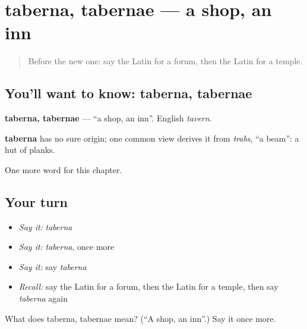 \section[taberna, tabernae]{taberna, tabernae — a shop, an inn}

\label{lesson:LA-C107-taberna}



\begin{quote}
Before the new one: say the Latin for a forum, then the Latin for a temple.
\end{quote}

\subsection*{You'll want to know: taberna, tabernae}
\textbf{taberna, tabernae} — \textquotedblleft{}a shop, an inn\textquotedblright{}. English \emph{tavern}.

\begin{cousinweb}
\textbf{taberna} has no sure origin; one common view derives it from \emph{trabs}, \textquotedblleft{}a beam\textquotedblright{}: a hut of planks.
\end{cousinweb}

\begin{grammarlens}[title={What you've built}]
One more word for this chapter.
\end{grammarlens}

\subsection*{Your turn}
\begin{itemize}
\raggedright
  \item \emph{Say it:} \emph{taberna}
  \item \emph{Say it:} \emph{taberna}, once more
  \item \emph{Say it:} say \emph{taberna}
  \item \emph{Recall:} say the Latin for a forum, then the Latin for a temple, then say \emph{taberna} again
\end{itemize}

\begin{tcolorbox}[breakable,colback=teal!4,colframe=teal!35!black,title={Before you move on}]
What does taberna, tabernae mean? (\textquotedblleft{}A shop, an inn\textquotedblright{}.) Say it once more.
\end{tcolorbox}
